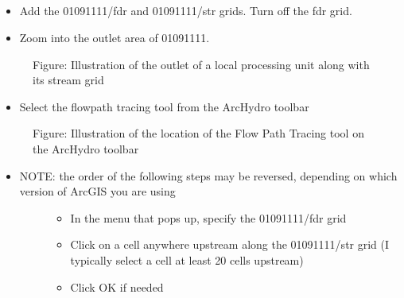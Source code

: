 \documentclass[letterpaper,10pt,english]{sphinxmanual}
\begin{document}
\subparagraph{}
\label{\detokenize{ex_2:outlet-trace}}\begin{itemize}
\item {} 
Add the 01091111/fdr and 01091111/str grids.  Turn off the fdr grid.

\item {} 
Zoom into the outlet area of 01091111.

\end{itemize}

\begin{figure}[htbp]
\centering
\capstart

\noindent{}
\caption{Figure: Illustration of the outlet of a local processing unit along with its stream grid}\label{\detokenize{ex_2:id19}}\end{figure}
\begin{itemize}
\item {} 
Select the flowpath tracing tool from the ArcHydro toolbar

\end{itemize}

\begin{figure}[htbp]
\centering
\capstart

\noindent{}
\caption{Figure: Illustration of the location of the Flow Path Tracing tool on the ArcHydro toolbar}\label{\detokenize{ex_2:id20}}\end{figure}
\begin{itemize}
\item {} \begin{description}
\item[{NOTE: the order of the following steps may be reversed, depending on which version of ArcGIS you are using}] \leavevmode\begin{itemize}
\item {} 
In the menu that pops up, specify the 01091111/fdr grid

\item {} 
Click on a cell anywhere upstream along the 01091111/str grid (I typically select a cell at least 20 cells upstream)

\item {} 
Click OK if needed

\end{itemize}

\end{description}

\end{itemize}
\end{document}
